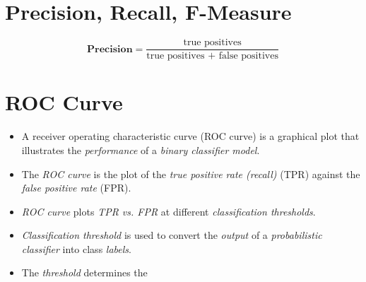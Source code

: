 \documentclass[
	title={Naïve Bayes Learning}
]{cs584notes}
\begin{document}
\section{Precision, Recall, F-Measure}\label{sec:precision-recall-f-measure}
\begin{equation}
	\mathbf{Precision} = \frac{\mbox{true positives}}{\mbox{true positives } + \mbox{ false positives}}
	\label{eq:precision}
\end{equation}

\section{ROC Curve}\label{sec:roc-curve}
\begin{itemize}
	\item A receiver operating characteristic curve (ROC curve) is a graphical plot that illustrates the \emph{performance} of a \emph{binary classifier model}.
	\item The \emph{ROC curve} is the plot of the \emph{true positive rate (recall)} (TPR) against the \emph{false positive rate} (FPR).
	\item \emph{ROC curve} plots \emph{TPR vs. FPR} at different \emph{classification thresholds}.
	\item \emph{Classification threshold} is used to convert the \emph{output} of a \emph{probabilistic classifier} into class \emph{labels}.
	\item The \emph{threshold} determines the
\end{itemize}
\end{document}
